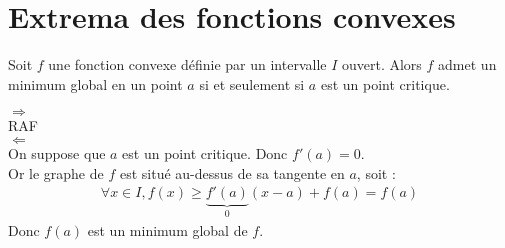 \documentclass[../main.tex]{subfiles}
\begin{document}
\section{Extrema des fonctions convexes}
\begin{tcolorbox}[title=Propostion 19.20, title filled=false, colframe=lightblue, colback=lightblue!10!white]
    Soit $f$ une fonction convexe définie par un intervalle $I$ ouvert. Alors $f$ admet un minimum global en un point $a$ si et seulement si $a$ est un point critique. 
\end{tcolorbox}

$\boxed{\Rightarrow}$ \\
RAF \\

$\boxed{\Leftarrow}$ \\
On suppose que $a$ est un point critique. Donc $f'(a) = 0$. \\
Or le graphe de $f$ est situé au-dessus de sa tangente en $a$, soit : 
\begin{align*}
    \forall x \in I, f(x) \geq \underbrace{f'(a)}_{0}(x-a) + f(a) = f(a)
\end{align*}
Donc $f(a)$ est un minimum global de $f$.
\end{document}
